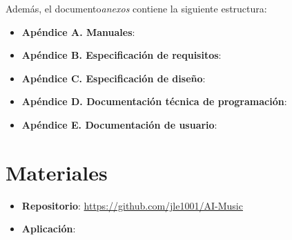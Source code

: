 Además, el documento\textit{anexos} contiene la siguiente estructura:

\begin{itemize}
\tightlist
\item \textbf{Apéndice A. Manuales}:
\item \textbf{Apéndice B. Especificación de requisitos}:
\item \textbf{Apéndice C. Especificación de diseño}:
\item \textbf{Apéndice D. Documentación técnica de programación}:
\item \textbf{Apéndice E. Documentación de usuario}:
\end{itemize}

\section{Materiales}

\begin{itemize}
\tightlist
\item \textbf{Repositorio}: \url{https://github.com/jle1001/AI-Music}
\item \textbf{Aplicación}:
\end{itemize}